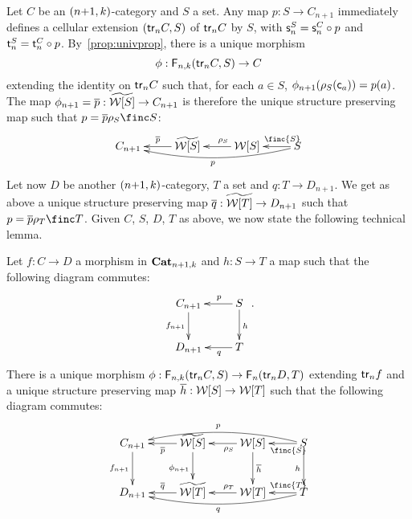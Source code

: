 \begin{paragr}\label{paragr:addproperties}
  Let $C$ be an $(n{+}1,k)$-category and $S$ a set. Any map
  $p:S\to C_{n+1}$ immediately defines a cellular extension $(\mathsf{tr}_{n} C,S)$ of
  $\mathsf{tr}_{n} C$ by $S$, with $\mathsf{s}_{n}^S=\mathsf{s}_{n}^C\circ p$ and $\mathsf{t}_{n}^S=\mathsf{t}_{n}^C\circ p$. By~\cref{prop:univprop}, there is a unique
  morphism
  \[\phi:\mathsf{F}_{n,k}(\mathsf{tr}_{n}C,S)\to C\]
  extending the identity on $\mathsf{tr}_{n} C$ such that, for each $a\in S$,
  $\phi_{n+1}(\rho_{S}(\mathsf{c}_{a}))=p(a)$. The map
  $\phi_{n+1}=\overline{p}:\widetilde{\mathcal{W}[S]}\to C_{n+1}$ is therefore the unique
 structure preserving map such that $p=\extend p\cans S\finc S$:
  \[
    \xymatrix{C_{n+1} & \wtxeq S\ar[l]_{\extend{p}} & \wtx S
      \ar[l]_(.4){\cans{S}} & S\ar[l]_(.3){\finc{S}} \ar@/^1em/[lll]^p}
  \]
 Let now $D$ be another $(n{+}1,k)$-category, $T$ a set and
 $q:T\to D_{n+1}$. We get as above a unique structure preserving map
 $\overline{q}:\widetilde{\mathcal{W}[T]}\to D_{n+1}$ such that $p=\extend p\cans T\finc
 T$. Given $C$, $S$, $D$, $T$ as above, we now state the following
 technical lemma.
 \begin{lemma}\label{lemma:tech}
   Let $f:C\to D$ a morphism in $\mathbf{Cat}_{n+1,k}$ and  $h:S\to T$ a
   map such that the following diagram commutes:
   \[
     \xymatrix{C_{n+1} \ar[d]_{f_{n+1}}& S\ar[d]^h\ar[l]_(.4){p}\\
       D_{n+1} & T\ar[l]^(.4){q}}.
   \]
   There is a  unique morphism $\phi:\mathsf{F}_{n,k}(\mathsf{tr}_{n} C,S)\to \mathsf{F}_{n}(\mathsf{tr}_{n} D,T)$ extending $\mathsf{tr}_{n} f$ and a unique structure preserving map $\overline{h}:\mathcal{W}[S]\to\mathcal{W}[T]$ such that the following diagram commutes:
    \begin{equation}
     \label{eq:tech}
     \xymatrix{
     C_{n+1} \ar[d]_{f_{n+1}}& \wtxeq S\ar[l]^{\extend{p}}\ar[d]_{\phi_{n+1}} & \wtx S
      \ar[l]^(.4){\cans{S}}\ar[d]^{\extend h} & S\ar[l]^(.3){\finc{S}}
      \ar@/_1em/[lll]_p\ar[d]_h\\
      D_{n+1} & \wtxeq T\ar[l]_{\extend{q}} & \wtx T
      \ar[l]_(.4){\cans{T}} & T\ar[l]_(.3){\finc{T}} \ar@/^1em/[lll]^q}
     \end{equation}
   
   
 \end{lemma}
 
  
\end{paragr}
  
 

 
 








 
 
 
